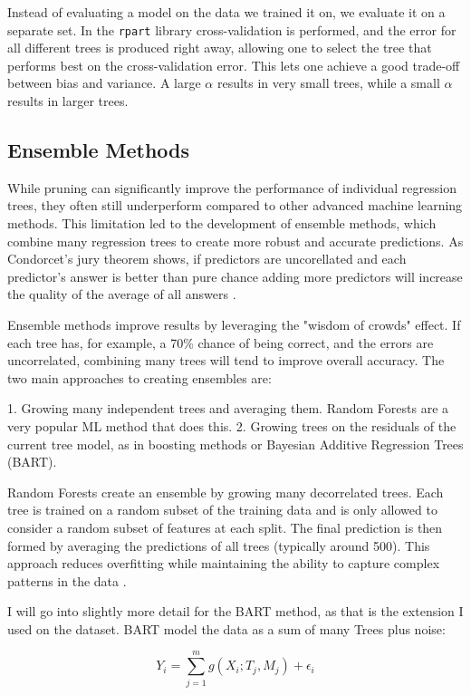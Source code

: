 \documentclass[12pt]{article}
\begin{document}
Instead of evaluating a model on the data we trained it on, we evaluate it on a separate set. In the \texttt{rpart} library cross-validation is performed, and the error for all different trees is produced right away, allowing one to select the tree that performs best on the cross-validation error. This lets one achieve a good trade-off between bias and variance. A large $\alpha$ results in very small trees, while a small $\alpha$ results in larger trees.


\subsection{Ensemble Methods}
While pruning can significantly improve the performance of individual regression trees, they often still underperform compared to other advanced machine learning methods. This limitation led to the development of ensemble methods, which combine many regression trees to create more robust and accurate predictions. As Condorcet's jury theorem shows, if predictors are uncorellated and each predictor's answer is better than pure chance adding more predictors will increase the quality of the average of all answers \citep{condorcet1785}.

Ensemble methods improve results by leveraging the "wisdom of crowds" effect. If each tree has, for example, a 70\% chance of being correct, and the errors are uncorrelated, combining many trees will tend to improve overall accuracy. The two main approaches to creating ensembles are:

1. Growing many independent trees and averaging them. Random Forests are a very popular ML method that does this.
2. Growing trees on the residuals of the current tree model, as in boosting methods or Bayesian Additive Regression Trees (BART).

Random Forests create an ensemble by growing many decorrelated trees. Each tree is trained on a random subset of the training data and is only allowed to consider a random subset of features at each split. The final prediction is then formed by averaging the predictions of all trees (typically around 500). This approach reduces overfitting while maintaining the ability to capture complex patterns in the data \citep{biau2016}.

I will go into slightly more detail for the BART method, as that is the extension I used on the dataset. BART model the data as a sum of many Trees plus noise:

\begin{equation}
    Y_i = \sum_{j=1}^{m} g(X_i; T_j, M_j) + \epsilon_i
\end{equation}
\end{document}
